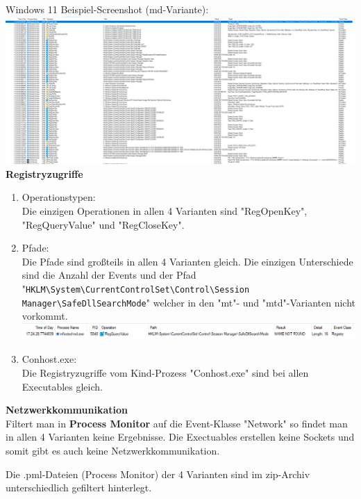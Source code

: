 \documentclass{article}
\begin{document}
	\pagebreak
	
	\noindent Windows 11 Beispiel-Screenshot (md-Variante):\\
	\includegraphics[width=0.7\linewidth]{"pictures/1.7 event class file3"}\\
	
	\noindent\textbf{Registryzugriffe}\\
	\begin{enumerate}
		\item Operationstypen:\\
		Die einzigen Operationen in allen 4 Varianten sind "RegOpenKey", "RegQueryValue" und "RegCloseKey".
		\item Pfade:\\
		Die Pfade sind großteils in allen 4 Varianten gleich. Die einzigen Unterschiede sind die Anzahl der Events und der Pfad "\texttt{HKLM\textbackslash System\textbackslash CurrentControlSet\textbackslash Control\textbackslash Session Manager\textbackslash SafeDllSearchMode}" welcher in den "mt"- und "mtd"-Varianten nicht vorkommt.\\
		\includegraphics[width=0.9\linewidth]{"pictures/1.7 event class registry2"}
		\item Conhost.exe:\\
		Die Registryzugriffe vom Kind-Prozess "Conhost.exe" sind bei allen Executables gleich.
	\end{enumerate}
	\noindent\textbf{Netzwerkkommunikation}\\
	Filtert man in \textbf{Process Monitor} auf die Event-Klasse "Network" so findet man in allen 4 Varianten keine Ergebnisse. Die Exectuables erstellen keine Sockets und somit gibt es auch keine Netzwerkkommunikation.
	
	\begin{mynote}
		Die .pml-Dateien (Process Monitor) der 4 Varianten sind im zip-Archiv unterschiedlich gefiltert hinterlegt.
	\end{mynote}
	\pagebreak
	
\end{document}
